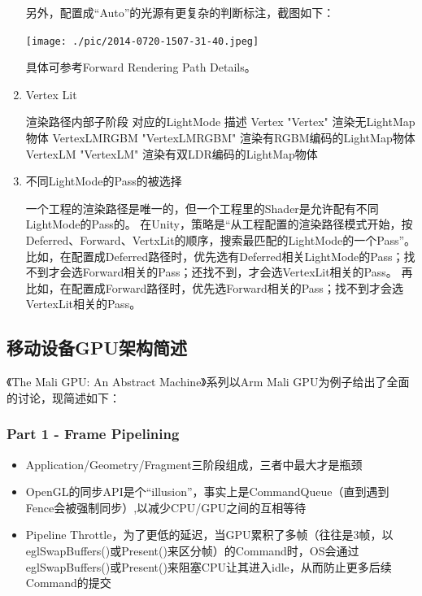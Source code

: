 \documentclass[9pt, b5paper]{article}
\begin{document}
\begin{enumerate}
另外，配置成“Auto”的光源有更复杂的判断标注，截图如下：

\begin{center}
\texttt{[image: ./pic/2014-0720-1507-31-40.jpeg]}
\end{center}

具体可参考Forward Rendering Path Details。

\item Vertex Lit
\label{sec:orga6330a0}

渲染路径内部子阶段	对应的LightMode	描述
Vertex	"Vertex"	渲染无LightMap物体
VertexLMRGBM	"VertexLMRGBM"	渲染有RGBM编码的LightMap物体
VertexLM	"VertexLM"	渲染有双LDR编码的LightMap物体

\item 不同LightMode的Pass的被选择
\label{sec:orge424dad}

一个工程的渲染路径是唯一的，但一个工程里的Shader是允许配有不同LightMode的Pass的。
在Unity，策略是“从工程配置的渲染路径模式开始，按Deferred、Forward、VertxLit的顺序，搜索最匹配的LightMode的一个Pass”。
比如，在配置成Deferred路径时，优先选有Deferred相关LightMode的Pass；找不到才会选Forward相关的Pass；还找不到，才会选VertexLit相关的Pass。
再比如，在配置成Forward路径时，优先选Forward相关的Pass；找不到才会选VertexLit相关的Pass。
\end{enumerate}

\subsection{移动设备GPU架构简述}
\label{sec:orgad03c70}

《The Mali GPU: An Abstract Machine》系列以Arm Mali GPU为例子给出了全面的讨论，现简述如下：

\subsubsection{Part 1 - Frame Pipelining}
\label{sec:org9bf5ba7}
\begin{itemize}
\item Application/Geometry/Fragment三阶段组成，三者中最大才是瓶颈
\item OpenGL的同步API是个“illusion”，事实上是CommandQueue（直到遇到Fence会被强制同步）,以减少CPU/GPU之间的互相等待
\item Pipeline Throttle，为了更低的延迟，当GPU累积了多帧（往往是3帧，以eglSwapBuffers()或Present()来区分帧）的Command时，OS会通过eglSwapBuffers()或Present()来阻塞CPU让其进入idle，从而防止更多后续Command的提交
\end{itemize}
\end{document}
